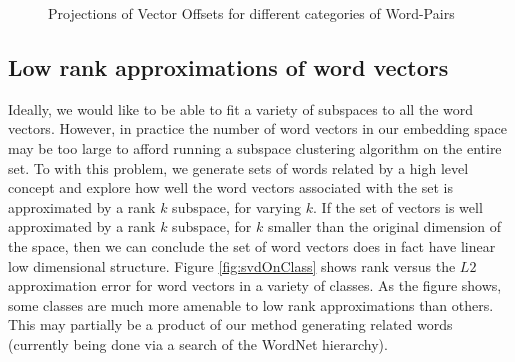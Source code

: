 \documentclass[11pt]{article}
\begin{document}
\begin{figure}[t]
\centering
{}

\caption{Projections of Vector Offsets for different categories of Word-Pairs}
\label{fig:offsetProj}
\end{figure}

\subsection{Low rank approximations of word vectors}
Ideally, we would like to be able to fit a variety of subspaces to all the word vectors. However, in practice the number of word vectors in our embedding space may be too large to afford running a subspace clustering algorithm on the entire set. To with this problem, we generate sets of words related by a high level concept and explore how well the word vectors associated with the set is approximated by a rank $k$ subspace, for varying $k$. If the set of vectors is well approximated by a rank $k$ subspace, for $k$ smaller than the original dimension of the space, then we can conclude the set of word vectors does in fact have linear low dimensional structure. Figure \ref{fig:svdOnClass} shows rank versus the $L2$ approximation error for word vectors in a variety of classes. As the figure shows, some classes are much more amenable to low rank approximations than others. This may partially be a product of our method generating related words (currently being done via a search of the WordNet hierarchy). 
\end{document}
